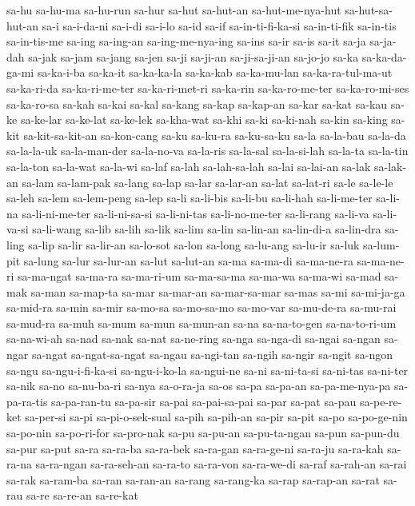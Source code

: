 {sa-hu sa-hu-ma sa-hu-run sa-hur sa-hut sa-hut-an sa-hut-me-nya-hut
sa-hut-sa-hut-an sa-i sa-i-da-ni sa-i-di sa-i-lo sa-id sa-if
sa-in-ti-fi-ka-si sa-in-ti-fik sa-in-tis sa-in-tis-me sa-ing sa-ing-an
sa-ing-me-nya-ing sa-ins sa-ir sa-is sa-it sa-ja sa-ja-dah sa-jak sa-jam
sa-jang sa-jen sa-ji sa-ji-an sa-ji-sa-ji-an sa-jo-jo sa-ka sa-ka-da-ga-mi
sa-ka-i-ba sa-ka-it sa-ka-ka-la sa-ka-kab sa-ka-mu-lan sa-ka-ra-tul-ma-ut
sa-ka-ri-da sa-ka-ri-me-ter sa-ka-ri-met-ri sa-ka-rin sa-ka-ro-me-ter
sa-ka-ro-mi-ses sa-ka-ro-sa sa-kah sa-kai sa-kal sa-kang sa-kap sa-kap-an
sa-kar sa-kat sa-kau sa-ke sa-ke-lar sa-ke-lat sa-ke-lek sa-kha-wat sa-khi
sa-ki sa-ki-nah sa-kin sa-king sa-kit sa-kit-sa-kit-an sa-kon-cang sa-ku
sa-ku-ra sa-ku-sa-ku sa-la sa-la-bau sa-la-da sa-la-la-uk sa-la-man-der
sa-la-no-va sa-la-ris sa-la-sal sa-la-si-lah sa-la-ta sa-la-tin sa-la-ton
sa-la-wat sa-la-wi sa-laf sa-lah sa-lah-sa-lah sa-lai sa-lai-an sa-lak
sa-lak-an sa-lam sa-lam-pak sa-lang sa-lap sa-lar sa-lar-an sa-lat
sa-lat-ri sa-le sa-le-le sa-leh sa-lem sa-lem-peng sa-lep sa-li sa-li-bis
sa-li-bu sa-li-hah sa-li-me-ter sa-li-na sa-li-ni-me-ter sa-li-ni-sa-si
sa-li-ni-tas sa-li-no-me-ter sa-li-rang sa-li-va sa-li-va-si sa-li-wang
sa-lib sa-lih sa-lik sa-lim sa-lin sa-lin-an sa-lin-di-a sa-lin-dra
sa-ling sa-lip sa-lir sa-lir-an sa-lo-sot sa-lon sa-long sa-lu-ang
sa-lu-ir sa-luk sa-lum-pit sa-lung sa-lur sa-lur-an sa-lut sa-lut-an sa-ma
sa-ma-di sa-ma-ne-ra sa-ma-ne-ri sa-ma-ngat sa-ma-ra sa-ma-ri-um
sa-ma-sa-ma sa-ma-wa sa-ma-wi sa-mad sa-mak sa-man sa-map-ta sa-mar
sa-mar-an sa-mar-sa-mar sa-mas sa-mi sa-mi-ja-ga sa-mid-ra sa-min sa-mir
sa-mo-sa sa-mo-sa-mo sa-mo-var sa-mu-de-ra sa-mu-rai sa-mud-ra sa-muh
sa-mum sa-mun sa-mun-an sa-na sa-na-to-gen sa-na-to-ri-um sa-na-wi-ah
sa-nad sa-nak sa-nat sa-ne-ring sa-nga sa-nga-di sa-ngai sa-ngan sa-ngar
sa-ngat sa-ngat-sa-ngat sa-ngau sa-ngi-tan sa-ngih sa-ngir sa-ngit sa-ngon
sa-ngu sa-ngu-i-fi-ka-si sa-ngu-i-ko-la sa-ngui-ne sa-ni sa-ni-ta-si
sa-ni-tas sa-ni-ter sa-nik sa-no sa-nu-ba-ri sa-nya sa-o-ra-ja sa-os sa-pa
sa-pa-an sa-pa-me-nya-pa sa-pa-ra-tis sa-pa-ran-tu sa-pa-sir sa-pai
sa-pai-sa-pai sa-par sa-pat sa-pau sa-pe-re-ket sa-per-si sa-pi
sa-pi-o-sek-sual sa-pih sa-pih-an sa-pir sa-pit sa-po sa-po-ge-nin
sa-po-nin sa-po-ri-for sa-pro-nak sa-pu sa-pu-an sa-pu-ta-ngan sa-pun
sa-pun-du sa-pur sa-put sa-ra sa-ra-ba sa-ra-bek sa-ra-gan sa-ra-ge-ni
sa-ra-ju sa-ra-kah sa-ra-na sa-ra-ngan sa-ra-seh-an sa-ra-to sa-ra-von
sa-ra-we-di sa-raf sa-rah-an sa-rai sa-rak sa-ram-ba sa-ran sa-ran-an
sa-rang sa-rang-ka sa-rap sa-rap-an sa-rat sa-rau sa-re sa-re-an sa-re-kat
}
